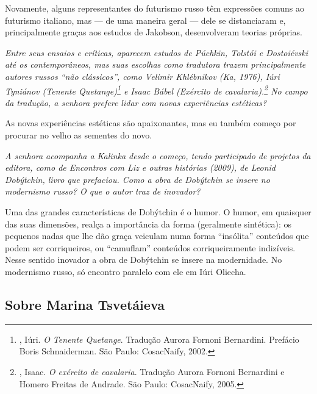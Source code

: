 Novamente, alguns representantes do futurismo russo têm expressões
comuns ao futurismo italiano, mas --- de uma maneira geral --- dele se
distanciaram e, principalmente graças aos estudos de Jakobson,
desenvolveram teorias próprias.

\medskip

\emph{Entre seus ensaios e críticas, aparecem estudos de Púchkin,
Tolstói e Dostoiévski até os contemporâneos, mas suas escolhas como
tradutora trazem principalmente autores russos ``não clássicos'', como
Velimir Khlébnikov (\emph{Ka}, 1976), Iúri Tyniánov (\emph{Tenente
Quetange})\footnote{, Iúri. \emph{O Tenente Quetange}.
  Tradução Aurora Fornoni Bernardini. Prefácio Boris Schnaiderman. São
  Paulo: CosacNaify, 2002.} e Isaac Bábel (\emph{Exército de cavalaria}).\footnote{, Isaac. \emph{O exército de cavalaria}. Tradução Aurora Fornoni Bernardini e Homero Freitas de
  Andrade. São Paulo: CosacNaify, 2005.} No campo da tradução, a
senhora prefere lidar com novas experiências estéticas?}

As novas experiências estéticas são apaixonantes, mas eu também começo
por procurar no velho as sementes do novo.

\medskip

\emph{A senhora acompanha a Kalinka desde o começo, tendo participado de
projetos da editora, como de \emph{Encontros com Liz e outras histórias} (2009), de Leonid Dobýtchin, livro que prefaciou. Como a obra de
Dobýtchin se insere no modernismo russo? O que o autor traz de
inovador?}

Uma das grandes características de Dobýtchin é o humor. O humor, em
quaisquer das suas dimensões, realça a importância da forma (geralmente
sintética): os pequenos nadas que lhe dão graça veiculam numa forma
``insólita'' conteúdos que podem ser corriqueiros, ou ``camuflam''
conteúdos corriqueiramente indizíveis. Nesse sentido inovador a obra de
Dobýtchin se insere na modernidade. No modernismo russo, só encontro
paralelo com ele em Iúri Oliecha.

\subsection{\uppercase{S}obre \uppercase{M}arina \uppercase{T}svetáieva}

